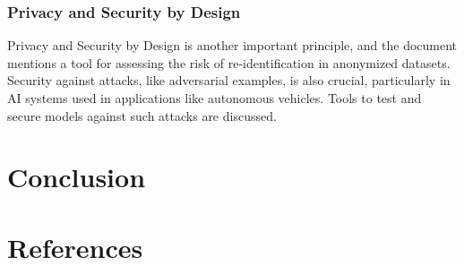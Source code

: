 \documentclass{article}
\begin{document}
\subsubsection{Privacy and Security by Design}
Privacy and Security by Design is another important principle, and the document mentions a tool for assessing the risk of re-identification in anonymized datasets. Security against attacks, like adversarial examples, is also crucial, particularly in AI systems used in applications like autonomous vehicles. Tools to test and secure models against such attacks are discussed.





\newpage
\section{Conclusion}

\newpage
\section{References}
\end{document}
